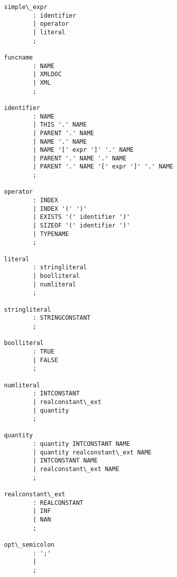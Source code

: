 \begin{Verbatim}[commandchars=\\\{\}]
simple\_expr
        : identifier
        | operator
        | literal
        ;

funcname
        : NAME
        | XMLDOC
        | XML
        ;

identifier
        : NAME
        | THIS '.' NAME
        | PARENT '.' NAME
        | NAME '.' NAME
        | NAME '[' expr ']' '.' NAME
        | PARENT '.' NAME '.' NAME
        | PARENT '.' NAME '[' expr ']' '.' NAME
        ;

operator
        : INDEX
        | INDEX '(' ')'
        | EXISTS '(' identifier ')'
        | SIZEOF '(' identifier ')'
        | TYPENAME
        ;

literal
        : stringliteral
        | boolliteral
        | numliteral
        ;

stringliteral
        : STRINGCONSTANT
        ;

boolliteral
        : TRUE
        | FALSE
        ;

numliteral
        : INTCONSTANT
        | realconstant\_ext
        | quantity
        ;

quantity
        : quantity INTCONSTANT NAME
        | quantity realconstant\_ext NAME
        | INTCONSTANT NAME
        | realconstant\_ext NAME
        ;

realconstant\_ext
        : REALCONSTANT
        | INF
        | NAN
        ;

opt\_semicolon
        : ';'
        |
        ;
\end{Verbatim}


